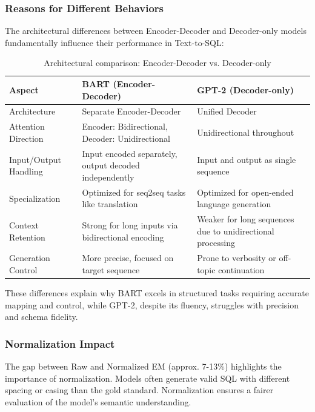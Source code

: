 \subsubsection{Reasons for Different Behaviors}
The architectural differences between Encoder-Decoder and Decoder-only models fundamentally influence their performance in Text-to-SQL:

\begin{table}[t]
\caption{Architectural comparison: Encoder-Decoder vs. Decoder-only}
\label{tab:q1_architecture_comparison}
\centering
\small
\begin{tabular}{|p{}|p{}|p{}|}
\hline
\textbf{Aspect} & \textbf{BART (Encoder-Decoder)} & \textbf{GPT-2 (Decoder-only)} \\
\hline
Architecture & Separate Encoder-Decoder & Unified Decoder \\
\hline
Attention Direction & Encoder: Bidirectional, Decoder: Unidirectional & Unidirectional throughout \\
\hline
Input/Output Handling & Input encoded separately, output decoded independently & Input and output as single sequence \\
\hline
Specialization & Optimized for seq2seq tasks like translation & Optimized for open-ended language generation \\
\hline
Context Retention & Strong for long inputs via bidirectional encoding & Weaker for long sequences due to unidirectional processing \\
\hline
Generation Control & More precise, focused on target sequence & Prone to verbosity or off-topic continuation \\
\hline
\end{tabular}
\end{table}

These differences explain why BART excels in structured tasks requiring accurate mapping and control, while GPT-2, despite its fluency, struggles with precision and schema fidelity.

\subsubsection{Normalization Impact}
The gap between Raw and Normalized EM (approx. 7-13\%) highlights the importance of normalization. Models often generate valid SQL with different spacing or casing than the gold standard. Normalization ensures a fairer evaluation of the model's semantic understanding.

